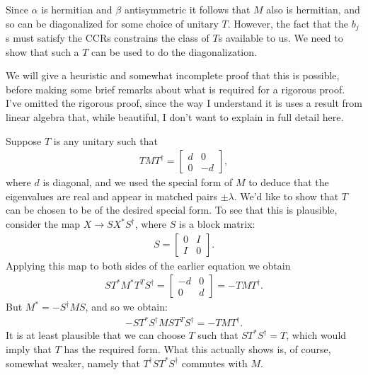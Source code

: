 \documentclass[12pt]{article}
\begin{document}
Since $\alpha$ is hermitian and $\beta$ antisymmetric it follows that
$M$ also is hermitian, and so can be diagonalized for some choice of
unitary $T$.  However, the fact that the $b_j$s must satisfy the CCRs
constrains the class of $T$s available to us.  We need to show that
such a $T$ can be used to do the diagonalization.

We will give a heuristic and somewhat incomplete proof that this is
possible, before making some brief remarks about what is required for
a rigorous proof. I've omitted the rigorous proof, since the way I
understand it is uses a result from linear algebra that, while
beautiful, I don't want to explain in full detail here.

Suppose $T$ is any unitary such that
\begin{eqnarray}
  T M T^\dagger = \left[ \begin{array}{cc} d & 0 \\ 0 & -d \end{array} \right],
\end{eqnarray}
where $d$ is diagonal, and we used the special form of $M$ to deduce
that the eigenvalues are real and appear in matched pairs $\pm
\lambda$.  We'd like to show that $T$ can be chosen to be of the
desired special form.  To see that this is plausible, consider the map
$X \rightarrow S X^* S^\dagger$, where $S$ is a block matrix:
\begin{eqnarray}
  S = \left[ \begin{array}{cc} 0 & I \\ I & 0 \end{array} \right].
\end{eqnarray}
Applying this map to both sides of the earlier equation we obtain
\begin{eqnarray}
  ST^* M^* T^T S^\dagger = 
\left[ \begin{array}{cc} -d & 0 \\ 0 & d \end{array} \right] = -TMT^\dagger.
\end{eqnarray}
But $M^* = -S^\dagger M S$, and so we obtain:
\begin{eqnarray}
  -ST^* S^\dagger M S T^T S^\dagger = -TMT^\dagger.
\end{eqnarray}
It is at least plausible that we can choose $T$ such that
$ST^*S^\dagger = T$, which would imply that $T$ has the required form.
What this actually shows is, of course, somewhat weaker, namely that
$T^\dagger ST^* S^\dagger$ commutes with $M$.  
\end{document}
